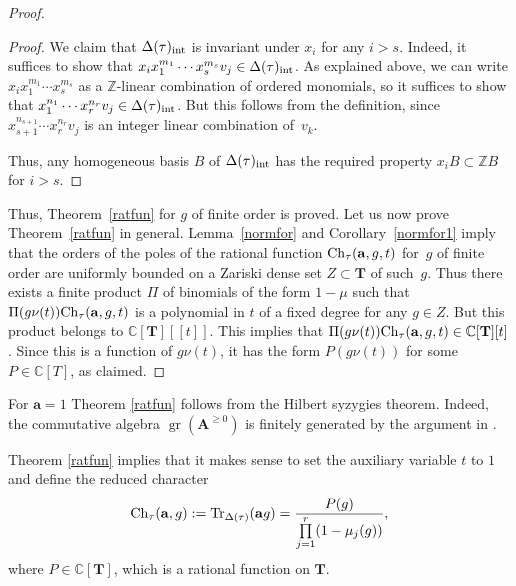 \documentclass[pdftex]{sigma}
\numberwithin{equation}{section}
\begin{document}
\begin{proof}
\begin{proof}
We claim that $\Delta(\tau)_{\rm int}$ is invariant under $x_i$ for any $i>s$. Indeed, it suffices to show that
$x_ix_1^{m_1}\cdots x_s^{m_s}v_j\in \Delta(\tau)_{\rm int}$. As explained above, we can write
$x_ix_1^{m_1}\cdots x_s^{m_s}$ as a ${\mathbb Z}$-linear combination of ordered monomials,
so it suffices to show that $x_1^{n_1}\cdots x_r^{n_r}v_j\in \Delta(\tau)_{\rm int}$. But this follows
from the definition, since $x_{s+1}^{n_{s+1}}\cdots x_r^{n_r}v_j$ is an integer linear combination of~$v_k$.

Thus, any homogeneous basis $B$ of $\Delta(\tau)_{\rm int}$ has the required property $x_iB\subset {\mathbb Z} B$ for $i>s$.
\end{proof}

Thus, Theorem~\ref{ratfun} for $g$ of finite order is proved. Let us now prove Theorem~\ref{ratfun} in ge\-neral. Lemma~\ref{normfor} and Corollary~\ref{normfor1} imply that the orders of the poles of the rational function ${\rm Ch}_\tau({\mathbf a},g,t)$ for~$g$ of finite order are uniformly bounded on a Zariski dense set $Z\subset {\mathbf T}$ of such~$g$. Thus there exists a finite product $\Pi$ of binomials of the form $1-\mu$ such that $\Pi(g\nu(t)){\rm Ch}_\tau({\mathbf a},g,t)$ is a polynomial in $t$ of a fixed degree for any $g\in Z$. But this product belongs to ${\mathbb C}[{\mathbf T}][[t]]$. This implies that $\Pi(g\nu(t)){\rm Ch}_\tau({\mathbf a},g,t)\in {\mathbb C}[{\mathbf T}][t]$. Since this is a function
of $g\nu(t)$, it has the form $P(g\nu(t))$ for some $P\in {\mathbb C}[T]$, as claimed.
\end{proof}

\begin{Remark}  For ${\mathbf a}=1$ Theorem \ref{ratfun} follows from the Hilbert syzygies theorem. Indeed, the commutative algebra $\operatorname{gr}({\mathbf A}^{\ge 0})$ is finitely generated by the argument in \cite[proof of Lemma~3.1.2]{GL}.
\end{Remark}

Theorem \ref{ratfun} implies that it makes sense to set the auxiliary variable $t$ to $1$ and define the reduced character
\begin{gather*}
{\rm Ch}_\tau({\mathbf a},g):=\operatorname{Tr}_{\Delta(\tau)}({\mathbf a}g)=\frac{P(g)}{\prod\limits_{j=1}^r(1-\mu_j(g))},
\end{gather*}
where $P\in {\mathbb C}[{\mathbf T}]$, which is a rational function on ${\mathbf T}$.
\end{document}
